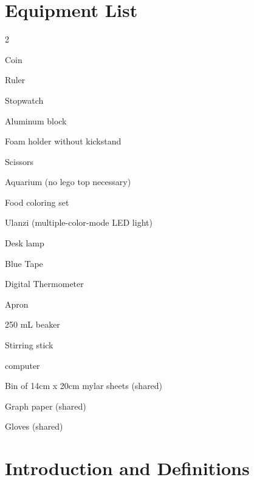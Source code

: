

\section*{Equipment List}

\begin{multicols}{2}   %
\begin{equipment}
\item Coin
\item Ruler
\item Stopwatch
\item Aluminum block 
\item Foam holder without kickstand
\item Scissors 
\item Aquarium (no lego top necessary)
\item Food coloring set
\item Ulanzi (multiple-color-mode LED light)
\item Desk lamp
\item Blue Tape
\item Digital Thermometer
\item Apron
\item 250 mL beaker
\item Stirring stick 
\item computer
\item Bin of 14cm x 20cm mylar sheets (shared)
\item Graph paper (shared)
\item Gloves  (shared)
\end{equipment}
\end{multicols}





\section{Introduction and Definitions}

